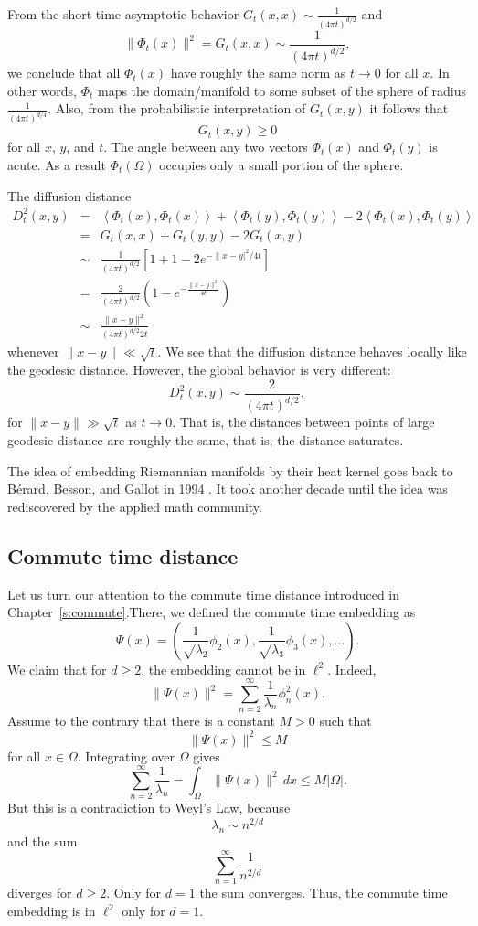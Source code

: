 From the short time asymptotic behavior $G_t(x,x)\sim\frac{1}{(4\pi t)^{d/2}}$ and $$\|\Phi_t(x)\|^2=G_t(x,x) \sim \frac{1}{(4\pi t)^{d/2}},$$ we conclude that all $\Phi_t(x)$ have roughly the same norm as $t\rightarrow 0$ for all $x$. In other words, $\Phi_t$ maps the domain/manifold to some subset of the sphere of radius $\frac{1}{(4\pi t)^{d/4}}$. Also, from the probabilistic interpretation of $G_t(x,y)$ it follows that $$G_t(x,y) \geq 0$$ for all $x$, $y$, and $t$. The angle between any two vectors $\Phi_t(x)$ and $\Phi_t(y)$ is acute. As a result $\Phi_t(\Omega)$ occupies only a small portion of the sphere.

The diffusion distance
\begin{eqnarray*}
D_t^2(x,y) &=& \left\langle\Phi_t(x),\Phi_t(x)\right\rangle + \left\langle\Phi_t(y),\Phi_t(y)\right\rangle -2\left\langle\Phi_t(x),\Phi_t(y)\right\rangle\\
&=& G_t(x,x)+G_t(y,y)-2 G_t(x,y)\\
&\sim& \frac{1}{(4\pi t)^{d/2}} \left[1+1-2 e^{-\|x-y|^2/{4t}}\right]\\
&=&\frac{2}{(4\pi t)^{d/2}} \left(1-e^{-\frac{\|x-y\|^2}{4t}}\right)\\
&\sim&\frac{\|x-y\|^2}{(4\pi t)^{d/2} 2t}
\end{eqnarray*}
whenever $\|x-y\| \ll \sqrt{t}$. We see that the diffusion distance behaves locally like the geodesic distance. However, the global behavior is very different:
\begin{equation*}
D_t^2(x,y) \sim \frac{2}{(4\pi t)^{d/2}},
\end{equation*}
for $\|x-y\| \gg \sqrt{t}$ as $t\to 0$. That is, the distances between points of large geodesic distance are roughly the same, that is, the distance saturates.

The idea of embedding Riemannian manifolds by their heat kernel goes back to B\'erard, Besson, and Gallot in 1994 \cite{berard1994embedding}. It took another decade until the idea was rediscovered by the applied math community.

\subsection{Commute time distance}
Let us turn our attention to the commute time distance introduced in Chapter~\ref{s:commute}.There, we defined the commute time embedding as
\begin{equation*}
\Psi(x) = \left(\frac{1}{\sqrt{\lambda_2}}\phi_2(x),\frac{1}{\sqrt{\lambda_3}}\phi_3(x),\ldots\right).
\end{equation*}
We claim that for $d\geq 2$, the embedding cannot be in $\ell^2$. Indeed,
$$\|\Psi(x)\|^2 = \sum_{n=2}^\infty \frac{1}{\lambda_n} \phi_n^2(x).$$ Assume to the contrary that there is a constant  $M>0$ such that $$\|\Psi(x)\|^2 \leq M$$ for all $x\in \Omega$. Integrating over $\Omega$ gives
$$\sum_{n=2}^\infty \frac{1}{\lambda_n} = \int_{\Omega} \|\Psi(x)\|^2\,dx \leq M |\Omega|.$$ But this is a contradiction to Weyl's Law, because
$$\lambda_n\sim n^{2/d}$$
and the sum
$$\sum_{n=1}^\infty \frac{1}{n^{2/d}}$$
diverges for $d \geq 2$. Only for $d=1$ the sum converges. Thus, the commute time embedding is in $\ell^2$ only for $d=1$.

